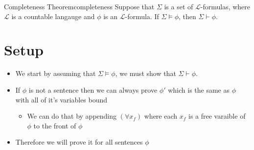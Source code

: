 \begin{theorem}{Completeness Theorem}{completeness}
Suppose that $\Sigma$ is a set of $\mathcal{L}$-formulas, where $ \mathcal{L}$ is a countable langauge  and $\phi$ is an $\mathcal{L}$-formula. If $\Sigma \models \phi$, then $\Sigma \vdash \phi$.

\section*{Setup}

\begin{itemize}
    \item We start by assuming that $ \Sigma \models \phi$, we must show that $ \Sigma \vdash \phi$.
    \item If $ \phi$ is not a sentence then we can always prove $ \phi'$ which is the same as $ \phi$ with all of it's variables bound
    \begin{itemize}
        \item We can do that by appending $ \left( \forall  x _{f}  \right)$ where each $ x_{f}$  is a free varaible of $ \phi$ to the front of $ \phi$ 
    \end{itemize}
\item Therefore we will prove it for all sentences $ \phi$ %
\end{itemize}

\end{theorem}

